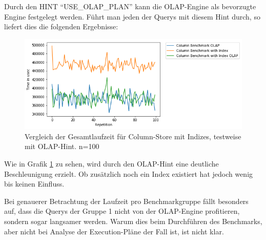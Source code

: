 Durch den HINT \enquote{USE\_OLAP\_PLAN} kann die OLAP-Engine als bevorzugte Engine festgelegt werden. Führt man jeden der Querys mit diesem Hint durch, so liefert dies die folgenden Ergebnisse:

\begin{figure}[H]
    \centering
    \includegraphics[scale=0.7]{images/olap_column_overall.png}
    \caption{Vergleich der Gesamtlaufzeit für Column-Store mit Indizes, testweise mit OLAP-Hint. n=100}
	\label{fig:olap_column_overall}
\end{figure}

Wie in Grafik \ref{fig:olap_column_overall} zu sehen, wird durch den OLAP-Hint eine deutliche Beschleunigung erzielt. Ob zusätzlich noch ein Index existiert hat jedoch wenig bis keinen Einfluss.

Bei genauerer Betrachtung der Laufzeit pro Benchmarkgruppe fällt besonders auf, dass die Querys der Gruppe 1 nicht von der OLAP-Engine profitieren, sondern sogar langsamer werden. 
Warum dies beim Durchführen des Benchmarks, aber nicht bei Analyse der Execution-Pläne der Fall ist, ist nicht klar.

